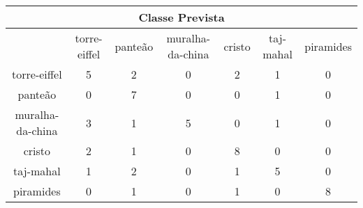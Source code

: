 \begin{tabular}{|c|c|c|c|c|c|c|}
\hline
\multicolumn{7}{|c|}{Classe Prevista}\\
\hline
 & torre-eiffel & panteão & muralha-da-china & cristo & taj-mahal & piramides\\
torre-eiffel & 5 & 2 & 0 & 2 & 1 & 0\\
panteão & 0 & 7 & 0 & 0 & 1 & 0\\
muralha-da-china & 3 & 1 & 5 & 0 & 1 & 0\\
cristo & 2 & 1 & 0 & 8 & 0 & 0\\
taj-mahal & 1 & 2 & 0 & 1 & 5 & 0\\
piramides & 0 & 1 & 0 & 1 & 0 & 8\\
\hline
\end{tabular}
